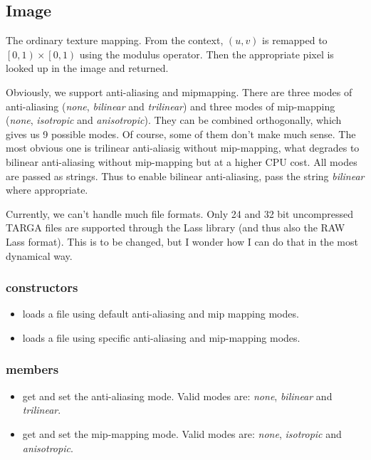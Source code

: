 \subsection{Image}

The ordinary texture mapping.  From the context, $\left(u, v\right)$ is remapped to $\left[0, 1\right) \times \left[0, 1\right)$ using the modulus operator.  Then the appropriate pixel is looked up in the image and returned.

Obviously, we support anti-aliasing and mipmapping.  There are three modes of anti-aliasing (\emph{none}, \emph{bilinear} and \emph{trilinear}) and three modes of mip-mapping (\emph{none}, \emph{isotropic} and \emph{anisotropic}).  They can be combined orthogonally, which gives us 9 possible modes.  Of course, some of them don't make much sense.  The most obvious one is trilinear anti-aliasig without mip-mapping, what degrades to bilinear anti-aliasing without mip-mapping but at a higher CPU cost.  All modes are passed as strings.  Thus to enable bilinear anti-aliasing, pass the string \emph{bilinear} where appropriate.

Currently, we can't handle much file formats.  Only 24 and 32 bit uncompressed TARGA files are supported through the Lass library (and thus also the RAW Lass format).  This is to be changed, but I wonder how I can do that in the most dynamical way.

\subsubsection*{constructors}
\begin{itemize}
	\item {} 
		loads a file using default anti-aliasing and mip mapping modes.
	\item {} 
		loads a file using specific anti-aliasing and mip-mapping modes.  
\end{itemize}

\subsubsection*{members}
\begin{itemize}
	\item {} 
		get and set the anti-aliasing mode.  Valid modes are: \emph{none}, \emph{bilinear} and \emph{trilinear}.
	\item {} 
		get and set the mip-mapping mode.  Valid modes are: \emph{none}, \emph{isotropic} and \emph{anisotropic}.
\end{itemize}

